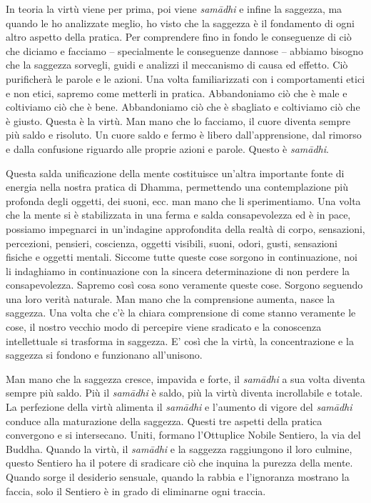 In teoria la virtù viene per prima, poi viene \emph{samādhi} e infine la
saggezza, ma quando le ho analizzate meglio, ho visto che la saggezza è
il fondamento di ogni altro aspetto della pratica. Per comprendere fino
in fondo le conseguenze di ciò che diciamo e facciamo -- specialmente le
conseguenze dannose -- abbiamo bisogno che la saggezza sorvegli, guidi e
analizzi il meccanismo di causa ed effetto. Ciò purificherà le parole e
le azioni. Una volta familiarizzati con i comportamenti etici e non
etici, sapremo come metterli in pratica. Abbandoniamo ciò che è male e
coltiviamo ciò che è bene. Abbandoniamo ciò che è sbagliato e coltiviamo
ciò che è giusto. Questa è la virtù. Man mano che lo facciamo, il cuore
diventa sempre più saldo e risoluto. Un cuore saldo e fermo è libero
dall'apprensione, dal rimorso e dalla confusione riguardo alle proprie
azioni e parole. Questo è \emph{samādhi}.

Questa salda unificazione della mente costituisce un'altra importante
fonte di energia nella nostra pratica di Dhamma, permettendo una
contemplazione più profonda degli oggetti, dei suoni, ecc. man mano che
li sperimentiamo. Una volta che la mente si è stabilizzata in una ferma
e salda consapevolezza ed è in pace, possiamo impegnarci in un'indagine
approfondita della realtà di corpo, sensazioni, percezioni, pensieri,
coscienza, oggetti visibili, suoni, odori, gusti, sensazioni fisiche e
oggetti mentali. Siccome tutte queste cose sorgono in continuazione, noi
li indaghiamo in continuazione con la sincera determinazione di non
perdere la consapevolezza. Sapremo così cosa sono veramente queste cose.
Sorgono seguendo una loro verità naturale. Man mano che la comprensione
aumenta, nasce la saggezza. Una volta che c'è la chiara comprensione di
come stanno veramente le cose, il nostro vecchio modo di percepire viene
sradicato e la conoscenza intellettuale si trasforma in saggezza. E'
così che la virtù, la concentrazione e la saggezza si fondono e
funzionano all'unisono.

Man mano che la saggezza cresce, impavida e forte, il \emph{samādhi} a sua
volta diventa sempre più saldo. Più il \emph{samādhi} è saldo, più la virtù
diventa incrollabile e totale. La perfezione della virtù alimenta il
\emph{samādhi} e l'aumento di vigore del \emph{samādhi} conduce alla maturazione della
saggezza. Questi tre aspetti della pratica convergono e si intersecano.
Uniti, formano l'Ottuplice Nobile Sentiero, la via del Buddha. Quando la
virtù, il \emph{samādhi} e la saggezza raggiungono il loro culmine, questo
Sentiero ha il potere di sradicare ciò che inquina la purezza della
mente.%
Quando sorge il desiderio sensuale, quando la
rabbia e l'ignoranza mostrano la faccia, solo il Sentiero è in grado di
eliminarne ogni traccia.

